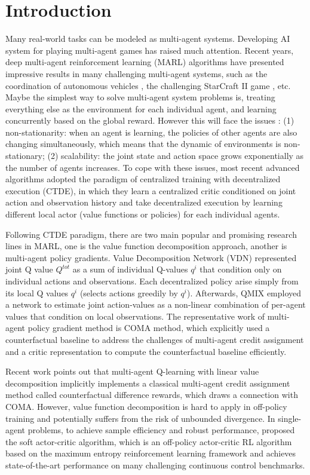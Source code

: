 \documentclass[runningheads]{llncs}
\begin{document}
\section{Introduction}
Many real-world tasks can be modeled as multi-agent systems. Developing AI system for playing multi-agent games has raised much
attention. 
Recent years, deep multi-agent reinforcement learning (MARL) algorithms \cite{b1} have presented impressive results in many challenging multi-agent systems, such as the coordination of autonomous vehicles \cite{b2}, the challenging StarCraft II game \cite{b3}, etc. Maybe the simplest way to solve multi-agent system problems is, treating everything else as the environment for each individual agent, and learning concurrently based on the global reward. However this will face the issues \cite{b4}: (1) non-stationarity: when an agent is learning, the policies of other agents are also changing simultaneously, which means that the dynamic of environments is non-stationary; (2) scalability:
the joint state and action space grows exponentially as the number of agents increases.
To cope with these issues, 
most recent advanced algorithms adopted the paradigm of centralized training with decentralized execution (CTDE)\cite{b5}, in which they learn a centralized critic conditioned on joint action and observation history and take decentralized execution by learning different local actor (value functions or policies) for each individual agents. 


Following CTDE paradigm, there are two main popular and promising research lines in MARL, one is the value function decomposition approach, another is multi-agent policy gradients. Value Decomposition Network (VDN) \cite{b6} represented joint Q value $Q^{tot}$ as a sum of individual Q-values $q^{i}$ that condition only on individual actions and observations. Each decentralized policy arise simply from its local Q values $q^{i}$ (selects actions greedily by $q^{i}$). Afterwards, QMIX \cite{b7} employed a network to estimate joint action-values as a non-linear combination of per-agent values that condition on local observations. The representative work of multi-agent policy gradient method is COMA \cite{b8} method, which explicitly used a counterfactual baseline to address the challenges of multi-agent credit assignment and a critic representation to compute the counterfactual baseline efficiently.

Recent work \cite{b16} points out that multi-agent Q-learning with linear value decomposition implicitly implements a classical multi-agent credit assignment method called counterfactual difference rewards, which draws a connection with COMA. 
However, value function decomposition is hard to apply in off-policy training and potentially suffers from the risk of unbounded divergence.
In single-agent problems, to achieve sample efficiency and robust performance, \cite{b6} proposed the soft actor-critic algorithm, which is an off-policy actor-critic RL algorithm based on the maximum entropy reinforcement learning framework and achieves state-of-the-art performance on many challenging continuous control benchmarks. 
\end{document}
